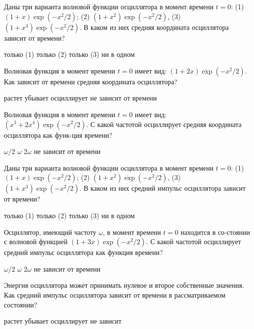 \documentclass[11pt,a4paper]{exam}
\begin{document}
\begin{questions}
\question Даны три варианта волновой функции осциллятора в момент времени $t=0$: (1) $(1+x)\exp (-{{x}^{2}}/2)$; (2) $(1+{{x}^{2}})\exp (-{{x}^{2}}/2)$, (3) $(1+{{x}^{3}})\exp (-{{x}^{2}}/2)$. В каком из них средняя координата осциллятора зависит от времени?
\begin{choices}
\choice только (1)     
\choice только (2)     
\choice только (3)     
\choice ни в одном 
\end{choices}

\question Волновая функция в момент времени $t=0$ имеет вид: $(1+2x)\exp (-{{x}^{2}}/2)$. Как зависит от времени средняя координата осциллятора?
\begin{choices}
\choice растет      
\choice убывает     
\choice осциллирует 
\choice не зависит от времени 
\end{choices}

\question Волновая функция в момент времени $t=0$ имеет вид: $({{x}^{3}}+2{{x}^{4}})\exp (-{{x}^{2}}/2)$. С какой частотой осциллирует средняя координата осциллятора как функ-ция времени?
\begin{choices}
\choice $\omega /2$     
\choice $\omega $    
\choice $2\omega $      
\choice не зависит от времени 
\end{choices}

\question Даны три варианта волновой функции осциллятора в момент времени $t=0$: (1) $(1+x)\exp (-{{x}^{2}}/2)$; (2) $(1+{{x}^{2}})\exp (-{{x}^{2}}/2)$, (3) $(1+{{x}^{3}})\exp (-{{x}^{2}}/2)$. В каком из них средний импульс осциллятора зависит от времени?
\begin{choices}
\choice только (1)     
\choice только (2)     
\choice только (3)     
\choice ни в одном 
\end{choices}

\question Осциллятор, имеющий частоту $\omega $, в момент времени $t=0$ находится в со-стоянии с волновой функцией $(1+3x)\exp (-{{x}^{2}}/2)$. С какой частотой осциллирует средний импульс осциллятора как функция времени?
\begin{choices}
\choice $\omega /2$     
\choice $\omega $    
\choice $2\omega $      
\choice не зависит от времени 
\end{choices}

\question Энергия осциллятора может принимать нулевое и второе собственные значения. Как средний импульс осциллятора зависит от времени в рассматриваемом состоянии?
\begin{choices}
\choice растет      
\choice убывает     
\choice осциллирует    
\choice не зависит
\end{choices}


\end{questions}
\end{document}
